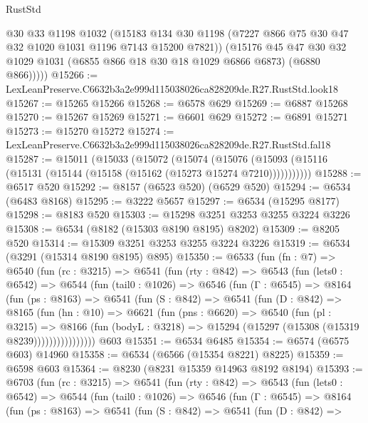 \begin{lexlean}{RustStd}
\begin{coremodule}
          @30
          @33
          @1198
          @1032
          (@15183 @134 @30 @1198 (@7227 @866 @75 @30 @47 @32 @1020 @1031 @1196 @7143 @15200 @7821))
          (@15176
            @45
            @47
            @30
            @32
            @1029
            @1031
            (@6855 @866 @18 @30 @18 @1029 @6866 @6873)
            (@6880 @866)))))
@15266 := LexLeanPreserve.C6632b3a2e999d115038026ca828209de.R27.RustStd.look18
@15267 := @15265 @15266
@15268 := @6578 @629
@15269 := @6887 @15268
@15270 := @15267 @15269
@15271 := @6601 @629
@15272 := @6891 @15271
@15273 := @15270 @15272
@15274 := LexLeanPreserve.C6632b3a2e999d115038026ca828209de.R27.RustStd.fal18
@15287 := @15011
    (@15033
      (@15072
        (@15074
          (@15076 (@15093 (@15116 (@15131 (@15144 (@15158 (@15162 (@15273 @15274 @7210)))))))))))
@15288 := @6517 @520
@15292 := @8157 (@6523 @520) (@6529 @520)
@15294 := @6534 (@6483 @8168)
@15295 := @3222 @5657
@15297 := @6534 (@15295 @8177)
@15298 := @8183 @520
@15303 := @15298 @3251 @3253 @3255 @3224 @3226
@15308 := @6534 (@8182 (@15303 @8190 @8195) @8202)
@15309 := @8205 @520
@15314 := @15309 @3251 @3253 @3255 @3224 @3226
@15319 := @6534 (@3291 (@15314 @8190 @8195) @895)
@15350 := @6533
    (fun (fn : @7) =>
    @6540
      (fun (rc : @3215) =>
      @6541
        (fun (rty : @842) =>
        @6543
          (fun (lets0 : @6542) =>
          @6544
            (fun (tail0 : @1026) =>
            @6546
              (fun (Γ : @6545) =>
              @8164
                (fun (ps : @8163) =>
                @6541
                  (fun (S : @842) =>
                  @6541
                    (fun (D : @842) =>
                    @8165
                      (fun (hn : @10) =>
                      @6621
                        (fun (pns : @6620) =>
                        @6540
                          (fun (pl : @3215) =>
                          @8166
                            (fun (bodyL : @3218) =>
                            @15294 (@15297 (@15308 (@15319 @8239))))))))))))))))
    @603
@15351 := @6534 @6485
@15354 := @6574 (@6575 @603) @14960
@15358 := @6534 (@6566 (@15354 @8221) @8225)
@15359 := @6598 @603
@15364 := @8230 (@8231 @15359 @14963 @8192 @8194)
@15393 := @6703
    (fun (rc : @3215) =>
    @6541
      (fun (rty : @842) =>
      @6543
        (fun (lets0 : @6542) =>
        @6544
          (fun (tail0 : @1026) =>
          @6546
            (fun (Γ : @6545) =>
            @8164
              (fun (ps : @8163) =>
              @6541
                (fun (S : @842) =>
                @6541
                  (fun (D : @842) =>

\end{coremodule}
\end{lexlean}
